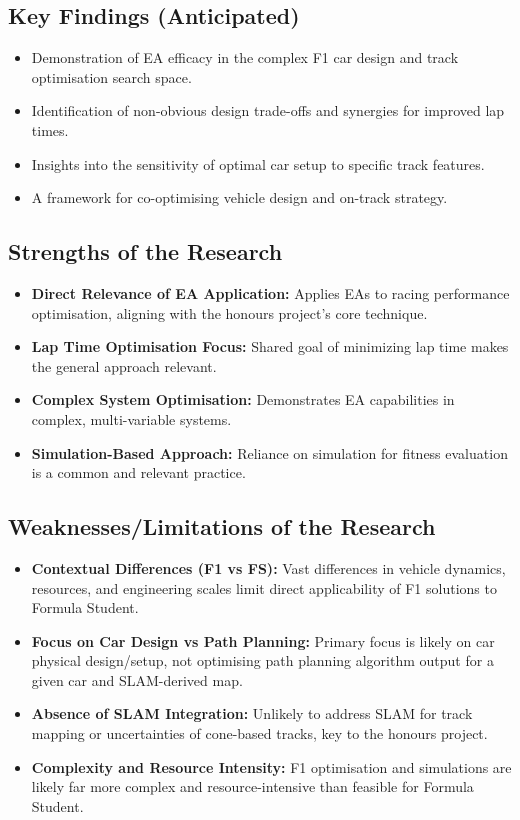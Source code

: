 \subsection{Key Findings (Anticipated)}\label{subsec:key-findings-(anticipated)}
\begin{itemize}
    \item Demonstration of EA efficacy in the complex F1 car design and track optimisation search space.
    \item Identification of non-obvious design trade-offs and synergies for improved lap times.
    \item Insights into the sensitivity of optimal car setup to specific track features.
    \item A framework for co-optimising vehicle design and on-track strategy.
\end{itemize}

\subsection{Strengths of the Research}\label{subsec:strengths-of-the-research}
\begin{itemize}
    \item \textbf{Direct Relevance of EA Application:} Applies EAs to racing performance optimisation, aligning with the honours project's core technique.
    \item \textbf{Lap Time Optimisation Focus:} Shared goal of minimizing lap time makes the general approach relevant.
    \item \textbf{Complex System Optimisation:} Demonstrates EA capabilities in complex, multi-variable systems.
    \item \textbf{Simulation-Based Approach:} Reliance on simulation for fitness evaluation is a common and relevant practice.
\end{itemize}

\subsection{Weaknesses/Limitations of the Research}\label{subsec:weaknesses/limitations-of-the-research}
\begin{itemize}
    \item \textbf{Contextual Differences (F1 vs FS):} Vast differences in vehicle dynamics, resources, and engineering scales limit direct applicability of F1 solutions to Formula Student.
    \item \textbf{Focus on Car Design vs Path Planning:} Primary focus is likely on car physical design/setup, not optimising path planning algorithm output for a given car and SLAM-derived map.
    \item \textbf{Absence of SLAM Integration:} Unlikely to address SLAM for track mapping or uncertainties of cone-based tracks, key to the honours project.
    \item \textbf{Complexity and Resource Intensity:} F1 optimisation and simulations are likely far more complex and resource-intensive than feasible for Formula Student.
\end{itemize}


